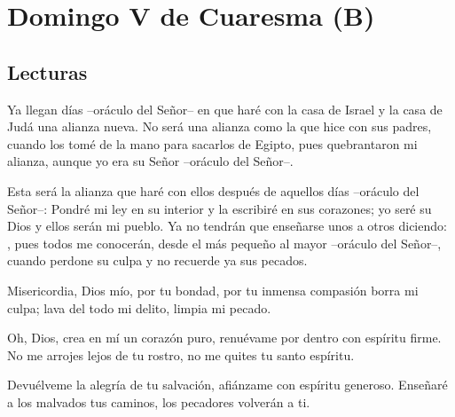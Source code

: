 \chapter{Domingo V de Cuaresma (B)}

\section{Lecturas}


 


\begin{scripture}
Ya llegan días –oráculo del Señor– en que haré con la casa de Israel y la casa de Judá una alianza nueva. No será una alianza como la que hice con sus padres, cuando los tomé de la mano para sacarlos de Egipto, pues quebrantaron mi alianza, aunque yo era su Señor –oráculo del Señor–.

Esta será la alianza que haré con ellos después de aquellos días –oráculo del Señor–: Pondré mi ley en su interior y la escribiré en sus corazones; yo seré su Dios y ellos serán mi pueblo. Ya no tendrán que enseñarse unos a otros diciendo: , pues todos me conocerán, desde el más pequeño al mayor –oráculo del Señor–, cuando perdone su culpa y no recuerde ya sus pecados.
\end{scripture}




	
\newpage 
{}

 


\begin{psbody}
Misericordia, Dios mío, por tu bondad,
por tu inmensa compasión borra mi culpa;
lava del todo mi delito,
limpia mi pecado. 

Oh, Dios, crea en mí un corazón puro,
renuévame por dentro con espíritu firme.
No me arrojes lejos de tu rostro,
no me quites tu santo espíritu. 

Devuélveme la alegría de tu salvación,
afiánzame con espíritu generoso.
Enseñaré a los malvados tus caminos,
los pecadores volverán a ti. 
\end{psbody}

